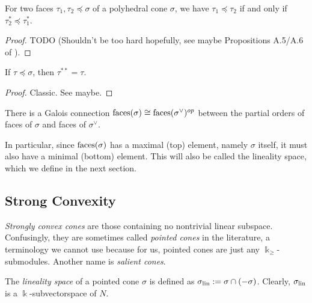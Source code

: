 \begin{proposition}
  \label{3-dual-face-antitone}
  For two faces \( \tau_1, \tau_2 \preceq \sigma \) of a polyhedral
  cone \( \sigma \), we have \( \tau_1 \preceq \tau_2 \) if and only
  if \( \tau_2^* \preceq \tau_1^* \).
\end{proposition}
\begin{proof}
  \uses{}
  TODO (Shouldn't be too hard hopefully, see maybe Propositions
  A.5/A.6 of \cite{Oda_1988}).
\end{proof}

\begin{proposition}
  \label{3-double-dual-face-dual-face}
  If $\tau \preceq \sigma$, then $\tau^{**} = \tau$.
\end{proposition}
\begin{proof}
  Classic. See \cite{Oda_1988} maybe.
\end{proof}

\begin{proposition}
  \label{3-faces-galois-connection}
  \uses{}
  There is a Galois connection \( \operatorname{faces}(\sigma) \cong
  \operatorname{faces}(\sigma^{\vee})^{op} \) between the partial orders of faces of
  \( \sigma \) and faces of \( \sigma^{\vee} \).
\end{proposition}

In particular, since \( \operatorname{faces}(\sigma) \) has a maximal (top) element,
namely \( \sigma \) itself, it must also have a minimal (bottom)
element. This will also be called the lineality space, which we define
in the next section.

\subsection{Strong Convexity}

\emph{Strongly convex cones} are those containing no nontrivial linear
subspace. Confusingly, they are sometimes called \emph{pointed cones}
in the literature, a terminology we cannot use because for us, pointed
cones are just any \( \Bbbk_{\geq} \)-submodules. Another name is
\emph{salient cones}.

\begin{definition}
  \label{3-lineality}
  The \emph{lineality space} of a pointed cone \( \sigma \) is defined
  as \( \sigma_{\operatorname{lin}} := \sigma \cap (-\sigma) \). Clearly, \(
  \sigma_{\operatorname{lin}} \) is a \( \Bbbk \)-subvectorspace of \( N \).
\end{definition}

